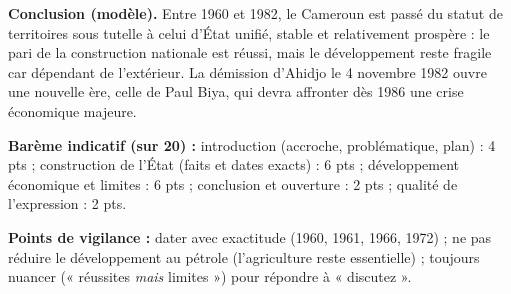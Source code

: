 \documentclass[11pt]{article}
\begin{document}
\begin{corrige}
\textbf{Conclusion (modèle).} Entre 1960 et 1982, le Cameroun est passé du statut de territoires sous tutelle à celui d'État unifié, stable et relativement prospère : le pari de la construction nationale est réussi, mais le développement reste fragile car dépendant de l'extérieur. La démission d'Ahidjo le 4 novembre 1982 ouvre une nouvelle ère, celle de Paul Biya, qui devra affronter dès 1986 une crise économique majeure.

\textbf{Barème indicatif (sur 20) :} introduction (accroche, problématique, plan) : 4 pts ; construction de l'État (faits et dates exacts) : 6 pts ; développement économique et limites : 6 pts ; conclusion et ouverture : 2 pts ; qualité de l'expression : 2 pts.

\textbf{Points de vigilance :} dater avec exactitude (1960, 1961, 1966, 1972) ; ne pas réduire le développement au pétrole (l'agriculture reste essentielle) ; toujours nuancer (« réussites \emph{mais} limites ») pour répondre à « discutez ».
\end{corrige}
\end{document}
